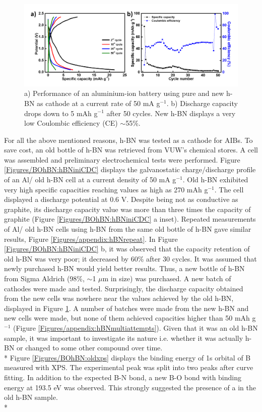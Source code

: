 \begin{figure}[tbh!]
\centering
\includegraphics[width=\textwidth]{Figures/BOhBN/BNNSCDCCE}
\caption{a) Performance of an aluminium-ion battery using pure and new h-BN as cathode at a current rate of 50 mA g$^{-1}$. b) Discharge capacity drops down to 5 mAh g$^{-1}$ after 50 cycles. New h-BN displays a very low Coulombic efficiency (CE) $\sim$55\%.}
\label{Figures/BOhBN:hBNCDCCE}
\end{figure}

For all the above mentioned reasons, h-BN was tested as a cathode for AIBs. To save cost, an old bottle of h-BN was retrieved from VUW's chemical stores. A cell was assembled and preliminary electrochemical tests were performed. Figure \ref{Figures/BOhBN:hBNiniCDC} displays the galvanostatic charge/discharge profile of an Al/ old h-BN cell at a current density of 50 mA g$^{-1}$. Old h-BN exhibited very high specific capacities reaching values as high as 270 mAh g$^{-1}$. The cell displayed a discharge potential at 0.6 V. Despite being not as conductive as graphite, its discharge capacity value was more than three times the capacity of graphite (Figure \ref{Figures/BOhBN:hBNiniCDC} a inset). Repeated measurements of Al/ old h-BN cells using h-BN from the same old bottle of h-BN gave similar results, Figure \ref{Figures/appendix:hBNrepeat}. In Figure \ref{Figures/BOhBN:hBNiniCDC} b, it was observed that the capacity retention of old h-BN was very poor; it decreased by 60\% after 30 cycles. It was assumed that newly purchased h-BN would yield better results. Thus, a new bottle of h-BN from Sigma Aldrich (98\%, $\sim$1 $\mu$m in size) was purchased. A new batch of cathodes were made and tested. Surprisingly, the discharge capacity obtained from the new cells was nowhere near the values achieved by the old h-BN, displayed in Figure \ref{Figures/BOhBN:hBNCDCCE}. A number of batches were made from the new h-BN and new cells were made, but none of them achieved capacities higher than 50 mAh g$^{-1}$ (Figure \ref{Figures/appendix:hBNmultiattempts}). Given that it was an old h-BN sample, it was important to investigate its nature i.e. whether it was actually h-BN or changed to some other compound over time.\\*
Figure \ref{Figures/BOhBN:oldxps} displays the binding energy of 1s orbital of B measured with XPS. The experimental peak was split into two peaks after curve fitting. In addition to the expected B-N bond, a new B-O bond with binding energy at 193.5 eV was observed. This strongly suggested the presence of a  in the old h-BN sample. \\*

